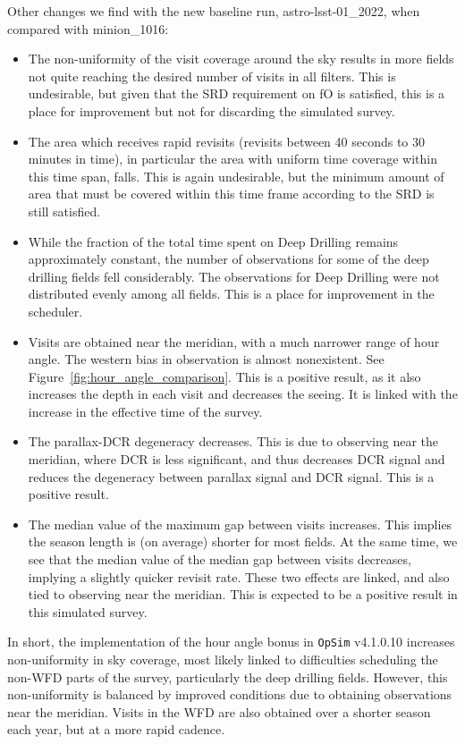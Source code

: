 \documentclass[DM,lsstdraft,authoryear,toc]{lsstdoc}
\newcommand{\opsim}{\texttt{OpSim}\xspace}
\begin{document}
Other changes we find with the new baseline run, astro-lsst-01\_2022, when compared with minion\_1016:
\begin{itemize}
\item The non-uniformity of the visit coverage around the sky results in more fields not quite reaching the desired number of visits in all filters. This is undesirable, but given that the SRD requirement on fO is satisfied, this is a place for improvement but not for discarding the simulated survey.
\item The area which receives rapid revisits (revisits between 40 seconds to 30 minutes in time), in particular the area with uniform time coverage within this time span, falls. This is again undesirable, but the minimum amount of area that must be covered within this time frame according to the SRD is still satisfied. 
\item While the fraction of the total time spent on Deep Drilling remains approximately constant, the number of observations for some of the deep drilling fields fell considerably. The observations for Deep Drilling were not distributed evenly among all fields. This is a place for improvement in the scheduler.
\item Visits are obtained near the meridian, with a much narrower range of hour angle. The western bias in observation is almost nonexistent. See Figure~\ref{fig:hour_angle_comparison}.  This is a positive result, as it also increases the depth in each visit and decreases the seeing. It is linked with the increase in the effective time of the survey.
\item The parallax-DCR degeneracy decreases. This is due to observing near the meridian, where DCR is less significant, and thus decreases DCR signal and reduces the degeneracy between parallax signal and DCR signal. This is a positive result.
\item The median value of the maximum gap between visits increases. This implies the season length is (on average) shorter for most fields. At the same time, we see that the median value of the median gap between visits decreases, implying a slightly quicker revisit rate. These two effects are linked, and also tied to observing near the meridian. This is expected to be a positive result in this simulated survey.
\end{itemize}
In short, the implementation of the hour angle bonus in \opsim v4.1.0.10 increases non-uniformity in sky coverage, most likely linked to difficulties scheduling the non-WFD parts of the survey, particularly the deep drilling fields. However, this non-uniformity is balanced by improved conditions due to obtaining observations near the meridian. Visits in the WFD are also obtained over a shorter season each year, but at a more rapid cadence.
\end{document}
